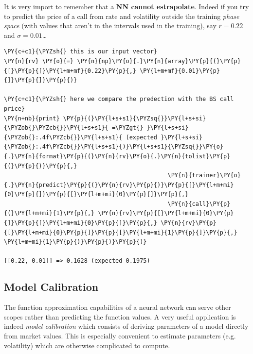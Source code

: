 It is very import to remember that a \textbf{NN cannot estrapolate}.
Indeed if you try to predict the price of a call from rate and
volatility outside the training \emph{phase space} (with values that
aren't in the intervals used in the training), say \(r = 0.22\) and
\(\sigma = 0.01\)\ldots{}

\begin{codebox}[breakable, size=fbox, boxrule=1pt, pad at break*=1mm,colback=cellbackground, colframe=cellborder]
\begin{Verbatim}[commandchars=\\\{\}]
\PY{c+c1}{\PYZsh{} this is our input vector}
\PY{n}{rv} \PY{o}{=} \PY{n}{np}\PY{o}{.}\PY{n}{array}\PY{p}{(}\PY{p}{[}\PY{p}{[}\PY{l+m+mf}{0.22}\PY{p}{,} \PY{l+m+mf}{0.01}\PY{p}{]}\PY{p}{]}\PY{p}{)}
	
\PY{c+c1}{\PYZsh{} here we compare the predection with the BS call price}
\PY{n+nb}{print} \PY{p}{(}\PY{l+s+s1}{\PYZsq{}}\PY{l+s+si}{\PYZob{}\PYZcb{}}\PY{l+s+s1}{ =\PYZgt{} }\PY{l+s+si}{\PYZob{}:.4f\PYZcb{}}\PY{l+s+s1}{ (expected }\PY{l+s+si}{\PYZob{}:.4f\PYZcb{}}\PY{l+s+s1}{)}\PY{l+s+s1}{\PYZsq{}}\PY{o}{.}\PY{n}{format}\PY{p}{(}\PY{n}{rv}\PY{o}{.}\PY{n}{tolist}\PY{p}{(}\PY{p}{)}\PY{p}{,} 
                                               \PY{n}{trainer}\PY{o}{.}\PY{n}{predict}\PY{p}{(}\PY{n}{rv}\PY{p}{)}\PY{p}{[}\PY{l+m+mi}{0}\PY{p}{]}\PY{p}{[}\PY{l+m+mi}{0}\PY{p}{]}\PY{p}{,} 
                                               \PY{n}{call}\PY{p}{(}\PY{l+m+mi}{1}\PY{p}{,} \PY{n}{rv}\PY{p}{[}\PY{l+m+mi}{0}\PY{p}{]}\PY{p}{[}\PY{l+m+mi}{0}\PY{p}{]}\PY{p}{,} \PY{n}{rv}\PY{p}{[}\PY{l+m+mi}{0}\PY{p}{]}\PY{p}{[}\PY{l+m+mi}{1}\PY{p}{]}\PY{p}{,} \PY{l+m+mi}{1}\PY{p}{)}\PY{p}{)}\PY{p}{)}

[[0.22, 0.01]] => 0.1628 (expected 0.1975)
\end{Verbatim}
\end{codebox}

\subsection{Model Calibration}\label{model-calibration}

The function approximation capabilities of a neural network can serve
other scopes rather than predicting the function values. A very useful
application is indeed \emph{model calibration} which consists of
deriving parameters of a model directly from market values. This is
especially convenient to estimate parameters (e.g. volatility) which are
otherwise complicated to compute.

